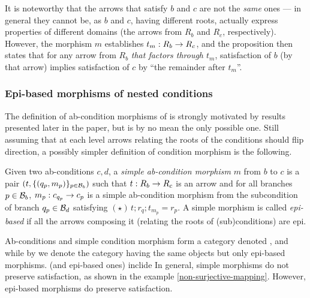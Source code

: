 It is noteworthy that the arrows that satisfy $b$ and $c$ are not the \emph{same} ones --- in general they cannot be, as $b$ and $c$, having different roots, actually express properties of different domains (the arrows from $R_b$ and $R_c$, respectively). However, the morphism $m$ establishes $t_m:R_b\rightarrow R_c$, and the proposition then states that for any arrow from $R_b$ \emph{that factors through $t_m$}, satisfaction of $b$ (by that arrow) implies satisfaction of $c$ by ``the remainder after $t_m$''.


\subsubsection{Epi-based morphisms of nested conditions}

The definition of ab-condition morphisms of  is strongly motivated by results presented later in the paper, but is by no mean the only possible one. Still assuming that at each level arrows relating the roots of the conditions should flip direction, a possibly simpler definition of condition morphism is the following.  

\begin{definition}
  Given two ab-conditions $c,d$, a \emph{simple ab-condition morphism} $m$ from $b$ to $c$ is a pair $(t,\{{(q_p,m_p)}\}_{p\in \mathcal{B}_b})$ such that $t:R_b\rightarrow R_c$ is an arrow and for all branches $p\in \mathcal{B}_b$, $m_p:c_{q_p}\rightarrow c_p$ is a simple ab-condition morphism from the subcondition of branch $q_p\in \mathcal{B}_d$ satisfying $(\star)\, t;r_q;t_{m_p}=r_p$. 
  A simple morphism is called \emph{epi-based} if all the arrows composing it (relating the roots of (sub)conditions) are epi. 
\end{definition}
%
Ab-conditions and simple condition morphism form a category denoted , and while by  we denote the category having the same objects but only epi-based morphisms.  (and epi-based ones) inclide
In general, simple morphisms do not preserve satisfaction, as shown in the example \ref{non-surjective-mapping}. However, epi-based morphisms do preserve satisfaction. 


